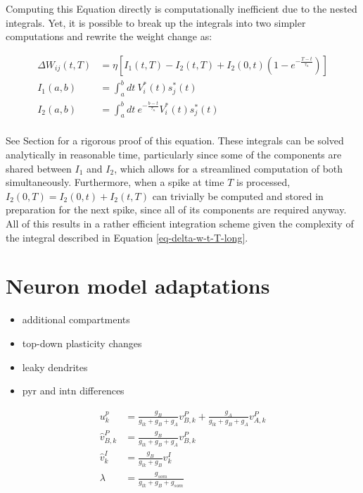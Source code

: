 Computing this Equation directly is computationally inefficient due to the nested integrals. Yet, it is possible to
break up the integrals into two simpler computations and rewrite the weight change as:


\begin{align}
  \Delta W_{ij}(t, T) & = \eta \left[ I_1 (t, T) - I_2(t,T) + I_2(0,t)\left( 1- e^{-\frac{T-t}{\tau_\kappa}} \right) \right] \\
  I_1(a, b)           & = \int_{a}^{b} dt \ V_i^\ast (t) s_j^\ast (t)                                                          \\
  I_2(a, b)           & = \int_{a}^{b} dt \ e^{-\frac{b-t}{\tau_\kappa}} V_i^\ast (t) s_j^\ast (t)                             \\
\end{align}

See Section  for a rigorous proof of this equation. These integrals can be solved analytically in reasonable 
time, particularly since some of the components are shared between $I_1$ and $I_2$, which allows for a streamlined 
computation of both simultaneously. Furthermore, when a spike at time $T$ is processed, $I_2(0,T) = I_2(0,t) + I_2(t, T)$
can trivially be computed and stored in preparation for the next spike, since all of its components are required anyway.
All of this results in a rather efficient integration scheme given the complexity of the integral described in Equation
\ref{eq-delta-w-t-T-long}.





\section{Neuron model adaptations}

\begin{itemize}
  \item additional compartments
  \item top-down plasticity changes
  \item leaky dendrites
  \item pyr and intn differences
\end{itemize}

\begin{align}
  u_k^p           & = \frac{g_B}{g_{lk} + g_B + g_A} v^P_{B,k} + \frac{g_A}{g_{lk} + g_B + g_A} v^P_{A,k} \\
  \hat{v}^P_{B,k} & = \frac{g_B}{g_{lk} + g_B + g_A} v^P_{B,k}                                            \\
  \hat{v}^I_{k}   & = \frac{g_B}{g_{lk} + g_B} v^I_{k}                                                    \\
  \lambda         & = \frac{g_{som}}{g_{lk} + g_B + g_{som}}
\end{align}



